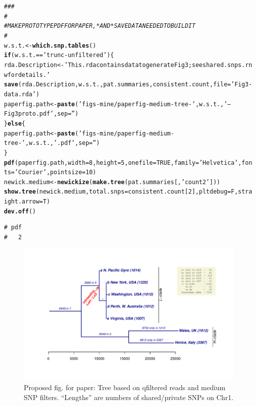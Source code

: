 \documentclass{article}\usepackage[]{graphicx}\usepackage[]{color}
\makeatletter
\newcommand{\hlnum}[1]{\textcolor[rgb]{0.686,0.059,0.569}{#1}}%
\newcommand{\hlstr}[1]{\textcolor[rgb]{0.192,0.494,0.8}{#1}}%
\newcommand{\hlcom}[1]{\textcolor[rgb]{0.678,0.584,0.686}{\textit{#1}}}%
\newcommand{\hlopt}[1]{\textcolor[rgb]{0,0,0}{#1}}%
\newcommand{\hlstd}[1]{\textcolor[rgb]{0.345,0.345,0.345}{#1}}%
\newcommand{\hlkwa}[1]{\textcolor[rgb]{0.161,0.373,0.58}{\textbf{#1}}}%
\newcommand{\hlkwb}[1]{\textcolor[rgb]{0.69,0.353,0.396}{#1}}%
\newcommand{\hlkwc}[1]{\textcolor[rgb]{0.333,0.667,0.333}{#1}}%
\newcommand{\hlkwd}[1]{\textcolor[rgb]{0.737,0.353,0.396}{\textbf{#1}}}%
\newenvironment{kframe}{%
 \def\at@end@of@kframe{}%
 \ifinner\ifhmode%
  \def\at@end@of@kframe{\end{minipage}}%
  \begin{minipage}{\columnwidth}%
 \fi\fi%
 \def\FrameCommand##1{\hskip\@totalleftmargin \hskip-\fboxsep
 \colorbox{shadecolor}{##1}\hskip-\fboxsep
     \hskip-\linewidth \hskip-\@totalleftmargin \hskip\columnwidth}%
 \MakeFramed {\advance\hsize-\width
   \@totalleftmargin\z@ \linewidth\hsize
   \@setminipage}}%
 {\par\unskip\endMakeFramed%
 \at@end@of@kframe}
\newenvironment{knitrout}{}{} %
\makeatother
\begin{document}
\begin{knitrout}\scriptsize
{}\color{fgcolor}\begin{kframe}
\begin{alltt}
\hlcom{###}
\hlcom{#}
\hlcom{# MAKE PROTOTYPE PDF FOR PAPER, *AND* SAVE DATA NEEDED TO BUILD IT}
\hlcom{#}
\hlstd{w.s.t.} \hlkwb{<-} \hlkwd{which.snp.tables}\hlstd{()}
\hlkwa{if}\hlstd{(w.s.t.} \hlopt{==} \hlstr{'trunc-unfiltered'}\hlstd{)\{}
  \hlstd{rda.Description} \hlkwb{<-} \hlstr{'This .rda contains data to generate Fig 3; see shared.snps.rnw for details.'}
  \hlkwd{save}\hlstd{(rda.Description, w.s.t., pat.summaries, consistent.count,} \hlkwc{file}\hlstd{=}\hlstr{'Fig3-data.rda'}\hlstd{)}
  \hlstd{paperfig.path} \hlkwb{<-} \hlkwd{paste}\hlstd{(}\hlstr{'figs-mine/paperfig-medium-tree-'}\hlstd{, w.s.t.,} \hlstr{'--Fig3proto.pdf'}\hlstd{,} \hlkwc{sep}\hlstd{=}\hlstr{''}\hlstd{)}
\hlstd{\}} \hlkwa{else} \hlstd{\{}
  \hlstd{paperfig.path} \hlkwb{<-} \hlkwd{paste}\hlstd{(}\hlstr{'figs-mine/paperfig-medium-tree-'}\hlstd{, w.s.t.,} \hlstr{'.pdf'}\hlstd{,} \hlkwc{sep}\hlstd{=}\hlstr{''}\hlstd{)}
\hlstd{\}}
\hlkwd{pdf}\hlstd{(paperfig.path,} \hlkwc{width}\hlstd{=}\hlnum{8}\hlstd{,}\hlkwc{height}\hlstd{=}\hlnum{5}\hlstd{,}\hlkwc{onefile}\hlstd{=}\hlnum{TRUE}\hlstd{,}\hlkwc{family}\hlstd{=}\hlstr{'Helvetica'}\hlstd{,}\hlkwc{fonts}\hlstd{=}\hlstr{'Courier'}\hlstd{,}\hlkwc{pointsize}\hlstd{=}\hlnum{10}\hlstd{)}
\hlstd{newick.medium} \hlkwb{<-} \hlkwd{newickize}\hlstd{(}\hlkwd{make.tree}\hlstd{(pat.summaries[,}\hlstr{'count2'}\hlstd{]))}
\hlkwd{show.tree}\hlstd{(newick.medium,} \hlkwc{total.snps}\hlstd{=consistent.count[}\hlnum{2}\hlstd{],} \hlkwc{pltdebug}\hlstd{=F,}\hlkwc{straight.arrow}\hlstd{=T)}
\hlkwd{dev.off}\hlstd{()}
\end{alltt}
\begin{verbatim}
# pdf 
#   2
\end{verbatim}
\end{kframe}
\end{knitrout}

\begin{figure}
  \hspace*{-1in}%
  \includegraphics{figs-mine/paperfig-medium-tree-Chr1-qfiltered.pdf}
  \caption{Proposed fig. for paper: Tree based on qfiltered reads and medium SNP filters.  ``Lengths'' are numbers of shared/private SNPs on Chr1.}
  \label{fig:tree-paper}
\end{figure}
\end{document}
